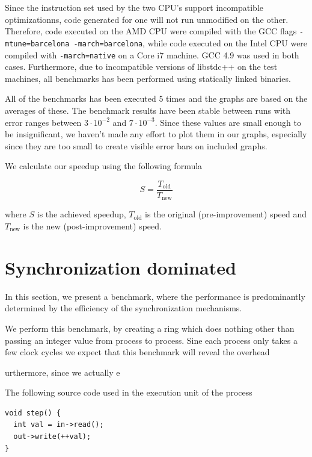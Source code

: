 Since the instruction set used by the two CPU's support incompatible
optimizationns, code generated for one will not run unmodified on the
other. Therefore, code executed on the AMD CPU were compiled with the
GCC flags \texttt{-mtune=barcelona -march=barcelona}, while code
executed on the Intel CPU were compiled with \texttt{-march=native} on
a Core i7 machine. GCC 4.9 was used in both cases. Furthermore,
due to incompatible versions of libstdc++ on the test machines, all
benchmarks has been performed using statically linked binaries.

All of the benchmarks has been executed 5 times and the graphs are
based on the averages of these. The benchmark results have been stable
between runs with error ranges between $3\cdot10^{-2}$ and
$7\cdot10^{-3}$. Since these values are small enough to be
insignificant, we haven't made any effort to plot them in our graphs,
especially since they are too small to create visible error bars on
included graphs.

We calculate our speedup using the following
formula\cite{hennessy2012computer}

\begin{equation*}
S = \frac{T_{\text{old}}}{T_{\text{new}}}
\end{equation*}

where $S$ is the achieved speedup, $T_{\text{old}}$ is the original
(pre-improvement) speed and $T_{\text{new}}$ is the new (post-improvement) speed.

\section{Synchronization dominated}
In this section, we present a benchmark, where the performance is
predominantly determined by the efficiency of the synchronization
mechanisms.

We perform this benchmark, by creating a ring which does nothing other
than passing an integer value from process to process. Sine each process
only takes a few clock cycles we expect that this benchmark will
reveal the overhead 

urthermore, since we actually 
e

The following source code used in the execution unit of the process
\begin{verbatim}
void step() {
  int val = in->read();
  out->write(++val);
}
\end{verbatim}

